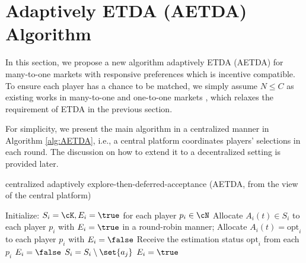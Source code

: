 
\section{Adaptively ETDA (AETDA) Algorithm}\label{sec:aetda}




In this section, we propose a new algorithm adaptively ETDA (AETDA) for many-to-one markets with responsive preferences which is incentive compatible. 
To ensure each player has a chance to be matched, we simply assume $N\le C$ as existing works in many-to-one and one-to-one markets \citep{liu2020competing,liu2021bandit,zhang2022matching,kong2023player,wang2022bandit}, which relaxes the requirement of ETDA in the previous section. 


For simplicity, we present the main algorithm in a centralized manner in Algorithm \ref{alg:AETDA}, i.e., a central platform coordinates players' selections in each round. The discussion on how to extend it to a decentralized setting is provided later.   


\begin{algorithm}[thb!]
    \caption{centralized adaptively explore-then-deferred-acceptance (AETDA, from the view of the central platform)}\label{alg:AETDA}
    \begin{algorithmic}[1]
    \STATE Initialize: $S_i = \cK, E_i = \true$ for each player $p_i \in \cN$ \label{alg:AETDA:initial}
        \STATE Allocate $A_i(t) \in S_i$ to each player $p_i$ with $E_i = \true$ in a round-robin manner; Allocate $A_i(t) = \mathrm{opt}_i$ to each player $p_i$ with $E_i = \false$ \label{alg:AETDA:exploit}
        \STATE Receive the estimation status $\mathrm{opt}_i$ from each $p_i$ \label{alg:AETDA:receiveOpt}
                \STATE $E_i = \false$ \label{alg:AETDA:opt:true:update}
        \ENDFOR
         \label{alg:aetda:detect:start} 
                \STATE $S_i = S_i \setminus \set{a_j}$ \label{alg:AETDA:update:Si}
                 \label{alg:aetda:detect:E:false:start}
                    \STATE $E_i = \true$ \label{alg:aetda:detect:E:false}
                \ENDIF
    \ENDFOR\label{alg:aetda:detect:end} 
    \ENDFOR
    \end{algorithmic}
\end{algorithm}


